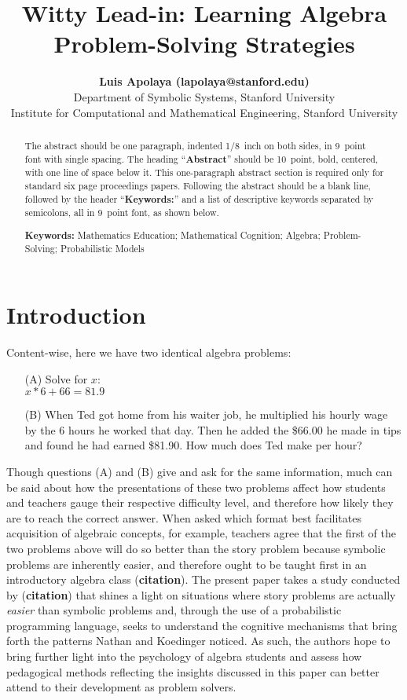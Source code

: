 \documentclass[10pt,letterpaper]{article}
\title{Witty Lead-in: Learning Algebra Problem-Solving Strategies}
\author{{\large \bf Luis Apolaya (lapolaya@stanford.edu)} \\
  Department of Symbolic Systems, Stanford University
  \AND {\large \bf Amy Shoemaker (amyshoe@stanford.edu)} \\
  Institute for Computational and Mathematical Engineering, Stanford University}
\begin{document}
\maketitle


\begin{abstract}
The abstract should be one paragraph, indented 1/8~inch on both sides,
in 9~point font with single spacing. The heading ``{\bf Abstract}''
should be 10~point, bold, centered, with one line of space below
it. This one-paragraph abstract section is required only for standard
six page proceedings papers. Following the abstract should be a blank
line, followed by the header ``{\bf Keywords:}'' and a list of
descriptive keywords separated by semicolons, all in 9~point font, as
shown below.

\textbf{Keywords:} 
Mathematics Education; Mathematical Cognition; Algebra; Problem-Solving; Probabilistic Models
\end{abstract}


\section{Introduction}

Content-wise, here we have two identical algebra problems:

\begin{enumerate}
\item[(A)] Solve for $x$:\\ $x * 6 + 66 = 81.9$

\item[(B)] When Ted got home from his waiter job, he multiplied his hourly wage by the 6 hours he worked that day. Then he added the \$66.00 he made in tips and found he had earned \$81.90. How much does Ted make per hour?
\end{enumerate}

Though questions (A) and (B) give and ask for the same information, much can be said about how the presentations of these two problems affect how students and teachers gauge their respective difficulty level, and therefore how likely they are to reach the correct answer. When asked which format best facilitates acquisition of algebraic concepts, for example, teachers agree that the first of the two problems above will do so better than the story problem because symbolic problems are inherently easier, and therefore ought to be taught first in an introductory algebra class (\textbf{citation}). The present paper takes a study conducted by (\textbf{citation}) that shines a light on situations where story problems are actually \textit{easier} than symbolic problems and, through the use of a probabilistic programming language, seeks to understand the cognitive mechanisms that bring forth the patterns Nathan and Koedinger noticed. As such, the authors hope to bring further light into the psychology of algebra students and assess how pedagogical methods reflecting the insights discussed in this paper can better attend to their development as problem solvers.
\end{document}
